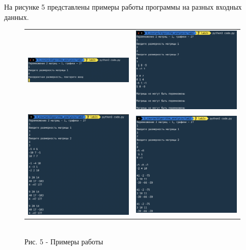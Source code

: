 \documentclass[a4paper,14pt]{article} %
\begin{document}
	На рисунке 5 представлены примеры работы программы на разных входных данных. 
	\begin{figure}[ht]\center
		\begin{tabular}{cc}
			\includegraphics[width=80mm]{ex1} & \includegraphics[width=80mm]{ex2} \\
			\includegraphics[width=80mm]{ex3} & \includegraphics[width=80mm]{ex4}
		\end{tabular}
		\\ Рис. 5 - Примеры работы
	\end{figure}
	        
\end{document}
